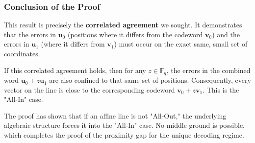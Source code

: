 \documentclass{article}
\begin{document}
\subsubsection{Conclusion of the Proof}
This result is precisely the \textbf{correlated agreement} we sought. It demonstrates that the errors in $\mathbf{u}_0$ (positions where it differs from the codeword $\mathbf{v}_0$) and the errors in $\mathbf{u}_1$ (where it differs from $\mathbf{v}_1$) must occur on the exact same, small set of coordinates.

If this correlated agreement holds, then for any $z \in \mathbb{F}_q$, the errors in the combined word $\mathbf{u}_0 + z\mathbf{u}_1$ are also confined to that same set of positions. Consequently, every vector on the line is close to the corresponding codeword $\mathbf{v}_0 + z\mathbf{v}_1$. This is the "All-In" case.

The proof has shown that if an affine line is not "All-Out," the underlying algebraic structure forces it into the "All-In" case. No middle ground is possible, which completes the proof of the proximity gap for the unique decoding regime.








\end{document}
